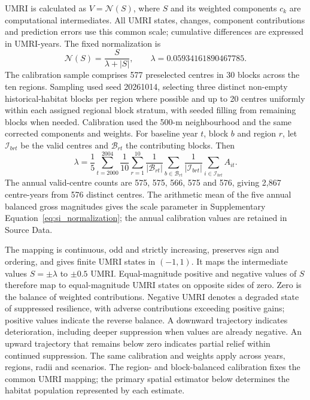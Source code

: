 UMRI is calculated as $V=\mathcal{N}(S)$, where $S$ and its weighted components $c_k$ are computational intermediates. All UMRI states, changes, component contributions and prediction errors use this common scale; cumulative differences are expressed in UMRI-years. The fixed normalization is
\begin{equation}\label{eq:si_normalization}
\mathcal{N}(S)=\frac{S}{\lambda+|S|},\qquad \lambda=0.05934161890467785.
\end{equation}
The calibration sample comprises 577 preselected centres in 30 blocks across the ten regions. Sampling used seed 20261014, selecting three distinct non-empty historical-habitat blocks per region where possible and up to 20 centres uniformly within each assigned regional block stratum, with seeded filling from remaining blocks when needed. Calibration used the 500-m neighbourhood and the same corrected components and weights. For baseline year $t$, block $b$ and region $r$, let $\mathcal{I}_{brt}$ be the valid centres and $\mathcal{B}_{rt}$ the contributing blocks. Then
\begin{equation}\label{eq:si_lambda}
\lambda=\frac{1}{5}\sum_{t=2000}^{2004}\frac{1}{10}\sum_{r=1}^{10}
\frac{1}{|\mathcal{B}_{rt}|}\sum_{b\in\mathcal{B}_{rt}}
\frac{1}{|\mathcal{I}_{brt}|}\sum_{i\in\mathcal{I}_{brt}}A_{it}.
\end{equation}
The annual valid-centre counts are 575, 575, 566, 575 and 576, giving 2,867 centre-years from 576 distinct centres. The arithmetic mean of the five annual balanced gross magnitudes gives the scale parameter in Supplementary Equation~\eqref{eq:si_normalization}; the annual calibration values are retained in Source Data.

The mapping is continuous, odd and strictly increasing, preserves sign and ordering, and gives finite UMRI states in $(-1,1)$. It maps the intermediate values $S=\pm\lambda$ to $\pm0.5$ UMRI. Equal-magnitude positive and negative values of $S$ therefore map to equal-magnitude UMRI states on opposite sides of zero. Zero is the balance of weighted contributions. Negative UMRI denotes a degraded state of suppressed resilience, with adverse contributions exceeding positive gains; positive values indicate the reverse balance. A downward trajectory indicates deterioration, including deeper suppression when values are already negative. An upward trajectory that remains below zero indicates partial relief within continued suppression. The same calibration and weights apply across years, regions, radii and scenarios. The region- and block-balanced calibration fixes the common UMRI mapping; the primary spatial estimator below determines the habitat population represented by each estimate.


